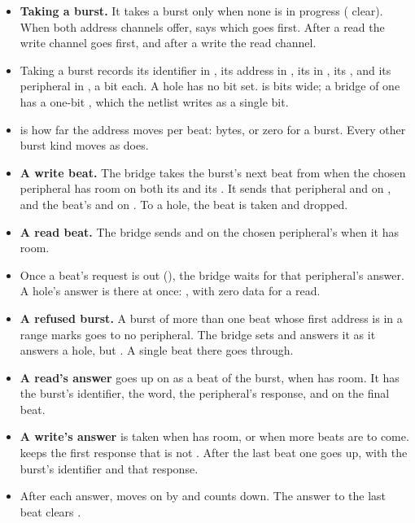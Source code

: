 \begin{itemize}
\item \textbf{Taking a burst.} It takes a burst only when none is in
progress ( clear). When both address channels offer,
 says which goes first. After a read the write channel
goes first, and after a write the read channel.
\item Taking a burst records its identifier in , its address
in , its  in , its , and
its peripheral in , a bit each. A hole has no bit set.
 is  bits wide; a bridge of one has a one-bit
, which the netlist writes as a single bit.
\item {} is how far the address moves per beat:
 bytes, or zero for a  burst. Every other
burst kind moves as  does.
\item \textbf{A write beat.} The bridge takes the burst's next beat
from  when the chosen peripheral has room on both its
 and its . It sends that peripheral  and
 on , and the beat's  and 
on . To a hole, the beat is taken and dropped.
\item \textbf{A read beat.} The bridge sends  and
 on the chosen peripheral's  when it has room.
\item Once a beat's request is out (), the bridge waits for
that peripheral's answer. A hole's answer is there at once:
, with zero data for a read.
\item \textbf{A refused burst.} A burst of more than one beat whose
first address is in a range  marks goes to no
peripheral. The bridge sets  and answers it as it
answers a hole, but . A single beat there goes through.
\item \textbf{A read's answer} goes up on  as a beat of the
burst, when  has room. It has the burst's identifier, the word,
the peripheral's response, and  on the final beat.
\item \textbf{A write's answer} is taken when  has room, or when
more beats are to come.  keeps the first response that is
not . After the last beat one  goes up, with the
burst's identifier and that response.
\item After each answer,  moves on by  and
 counts down. The answer to the last beat clears
.
\end{itemize}

